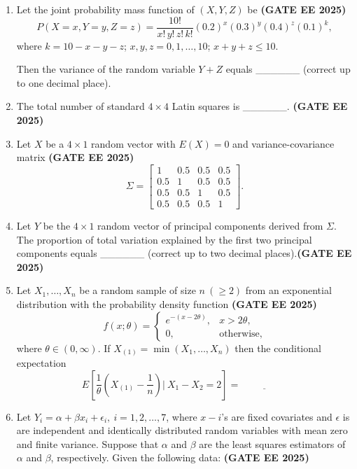 \documentclass[journal,12pt,onecolumn]{IEEEtran}
\theoremstyle{remark}
\begin{document}
\begin{enumerate}
    \item Let the joint probability mass function of $(X,Y,Z)$ be \hfill \textbf{(GATE EE 2025)}
    \[
        P(X = x, Y = y, Z = z) = \frac{10!}{x! \, y! \, z! \, k!} (0.2)^x (0.3)^y (0.4)^z (0.1)^k,
    \]
    where $k = 10 - x - y - z$; $x,y,z = 0,1,\ldots,10$; $x+y+z \leq 10$.

    Then the variance of the random variable $Y+Z$ equals \_\_\_\_\_\_ 
    \quad (correct up to one decimal place).

    \item The total number of standard $4 \times 4$ Latin squares is \_\_\_\_\_\_.
    \hfill \textbf{(GATE EE 2025)}
    \item Let $X$ be a $4 \times 1$ random vector with $E(X) = 0$ and variance-covariance matrix
    \hfill \textbf{(GATE EE 2025)}
    \[
        \Sigma = 
        \begin{bmatrix}
            1 & 0.5 & 0.5 & 0.5 \\
            0.5 & 1 & 0.5 & 0.5 \\
            0.5 & 0.5 & 1 & 0.5 \\
            0.5 & 0.5 & 0.5 & 1
        \end{bmatrix}.
    \]
   \item  Let $Y$ be the $4 \times 1$ random vector of principal components derived from $\Sigma$. The proportion of total variation explained by the first two principal components equals \_\_\_\_\_\_ \quad (correct up to two decimal places).\hfill \textbf{(GATE EE 2025)}

\item Let $X_1, \ldots, X_n$ be a random sample of size $n \ (\geq 2)$ from an exponential distribution with the probability density function \hfill \textbf{(GATE EE 2025)}
\[
f(x; \theta) = \begin{cases} 
e^{-(x-2\theta)}, & x > 2\theta, \\
0, & \text{otherwise,}
\end{cases}
\]
where $\theta \in (0,\infty)$. If $X_{(1)} = \min(X_1, \ldots, X_n)$ then the conditional expectation
\[
E\!\left[\frac{1}{\theta}\left(X_{(1)} - \frac{1}{n}\right) \Big| \ X_1 - X_2 = 2 \right] = \underline{\hspace{2cm}}
\]

\item Let $Y_i = \alpha + \beta x_i + \epsilon_i, \ i=1,2,\ldots,7$, where $x-i$'s are fixed covariates and $\epsilon$ is are independent and identically distributed random variables with mean zero and finite variance. Suppose that $\alpha$ and $\beta$ are the least squares estimators of $\alpha$ and $\beta$, respectively. Given the following data: \hfill \textbf{(GATE EE 2025)}


\end{enumerate}
\end{document}

